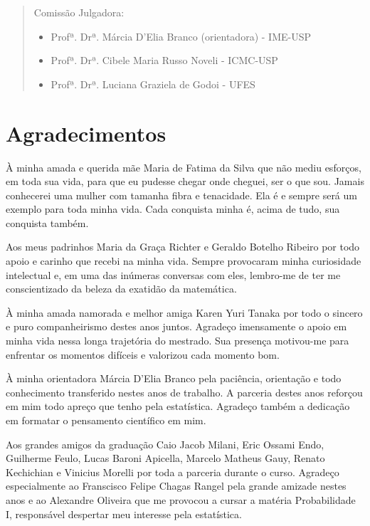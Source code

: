 \documentclass[12pt,twoside,a4paper]{book}
\begin{document}
     \begin{quote}
     \noindent Comissão Julgadora:
    
     \begin{itemize}
 		\item Profª. Drª. Márcia D'Elia Branco (orientadora) - IME-USP
 		\item Profª. Drª. Cibele Maria Russo Noveli - ICMC-USP
 		\item Profª. Drª. Luciana Graziela de Godoi - UFES
     \end{itemize}
      
     \end{quote}
 \pagebreak


\chapter*{Agradecimentos}
À minha amada e querida mãe Maria de Fatima da Silva que não mediu esforços, em toda sua vida, para que eu pudesse chegar onde cheguei, ser o que sou. Jamais conhecerei uma mulher com tamanha fibra e tenacidade. Ela é e sempre será um exemplo para toda minha vida. Cada conquista minha é, acima de tudo, sua conquista também.

Aos meus padrinhos Maria da Graça Richter e Geraldo Botelho Ribeiro por todo apoio e carinho que recebi na minha vida. Sempre provocaram minha curiosidade intelectual e, em uma das inúmeras conversas com eles, lembro-me de ter me conscientizado da beleza da exatidão da matemática.

À minha amada namorada e melhor amiga Karen Yuri Tanaka por todo o sincero e puro companheirismo destes anos juntos. Agradeço imensamente o apoio em minha vida nessa longa trajetória do mestrado. Sua presença motivou-me para enfrentar os momentos difíceis e valorizou cada momento bom.

À minha orientadora Márcia D'Elia Branco pela paciência, orientação e todo conhecimento transferido nestes anos de trabalho. A parceria destes anos reforçou em mim todo apreço que tenho pela estatística. Agradeço também a dedicação em formatar o pensamento científico em mim.

Aos grandes amigos da graduação Caio Jacob Milani, Eric Ossami Endo, Guilherme Feulo, Lucas Baroni Apicella, Marcelo Matheus Gauy, Renato Kechichian e Vinicius Morelli por toda a parceria durante o curso. Agradeço especialmente ao Franscisco Felipe Chagas Rangel pela grande amizade nestes anos e ao Alexandre Oliveira que me provocou a cursar a matéria Probabilidade I, responsável despertar meu interesse pela estatística.
\end{document}
